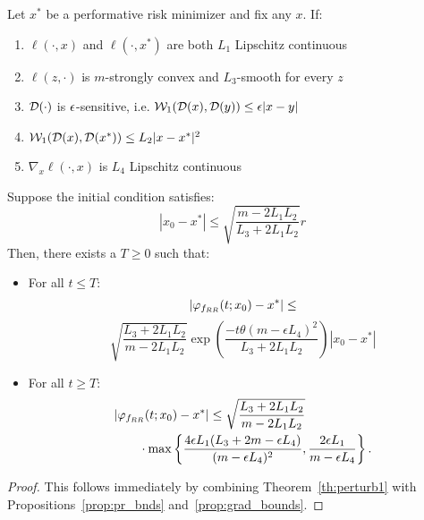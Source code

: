 \begin{corollary}
    Let $x^*$ be a performative risk minimizer and fix any $x$. If:
    \begin{enumerate}
    \item $\ell(\cdot,x)$ and $\ell(\cdot, x^*)$ are both $L_1$ Lipschitz continuous
    \item $\ell(z,\cdot)$ is $m$-strongly convex and $L_3$-smooth for every $z$
    \item $\mathcal{D}(\cdot)$ is $\epsilon$-sensitive, i.e. $\mathcal{W}_1(\mathcal{D}(x),\mathcal{D}(y)) \le \epsilon |x-y|$
    \item $\mathcal{W}_1(\mathcal{D}(x),\mathcal{D}(x^*)) \le L_2 |x-x^*|^2$
    \item $\nabla_x \ell(\cdot,x)$ is $L_4$ Lipschitz continuous
\end{enumerate}
Suppose the initial condition satisfies:
\[
|x_0 - x^*| \le \sqrt{\frac{m - 2L_1L_2}{L_3 + 2L_1L_2}}r
\]
Then, there exists a $T \ge 0$ such that:
\begin{itemize}
\item For all $t \le T$:
\[
|\varphi_{f_{RR}}(t;x_0) - x^*| \le 
\]
\[
\sqrt{\frac{L_3 + 2L_1L_2}{m - 2L_1L_2}} \exp\left(\frac{-t\theta (m-\epsilon L_4)^2}{L_3 + 2L_1L_2}\right) |x_0 - x^*|
\]
\item For all $t \ge T$:
\[
\begin{aligned}
    &|\varphi_{f_{RR}}(t;x_0) - x^*| \le 
\sqrt{\frac{L_3 + 2L_1L_2}{m - 2L_1L_2}} \\
&\qquad\cdot\max
\left\{
    \frac{4\epsilon L_1 (L_3 + 2m - \epsilon L_4)}{ (m-\epsilon L_4)^2},
    \frac{2 \epsilon L_1}{m - \epsilon L_4}
\right\}.
\end{aligned}
\]
\end{itemize}
\end{corollary}
\begin{proof}
This follows immediately by combining Theorem~\ref{th:perturb1} with Propositions~\ref{prop:pr_bnds} and~\ref{prop:grad_bounds}.
\end{proof}
